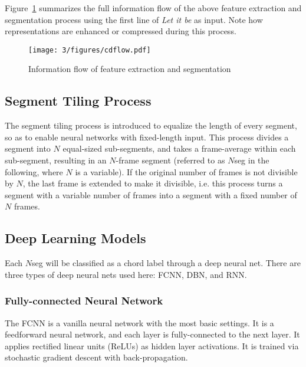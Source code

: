 
Figure~\ref{fig:3-cdflow} summarizes the full information flow of the above feature extraction and segmentation process using the first line of {\it Let it be} as input. Note how representations are enhanced or compressed during this process.
\begin{figure}[h]
\centering
\texttt{[image: 3/figures/cdflow.pdf]}
\caption{Information flow of feature extraction and segmentation}
\label{fig:3-cdflow}
\end{figure}

\subsection{Segment Tiling Process} \label{sec:3-seg-tile}

The segment tiling process is introduced to equalize the length of every segment, so as to enable neural networks with fixed-length input. This process divides a segment into $N$ equal-sized sub-segments, and takes a frame-average within each sub-segment, resulting in an $N$-frame segment (referred to as $N$seg in the following, where $N$ is a variable). If the original number of frames is not divisible by $N$, the last frame is extended to make it divisible, i.e. this process turns a segment with a variable number of frames into a segment with a fixed number of $N$ frames.

\subsection{Deep Learning Models} \label{sec:3-dlmodel}

Each $N$seg will be classified as a chord label through a deep neural net. There are three types of deep neural nets used here:  FCNN, DBN, and RNN.

\subsubsection{Fully-connected Neural Network}

The FCNN is a vanilla neural network with the most basic settings. It is a feedforward neural network, and each layer is fully-connected to the next layer. It applies rectified linear units (ReLUs) as hidden layer activations. It is trained via stochastic gradient descent with back-propagation.


